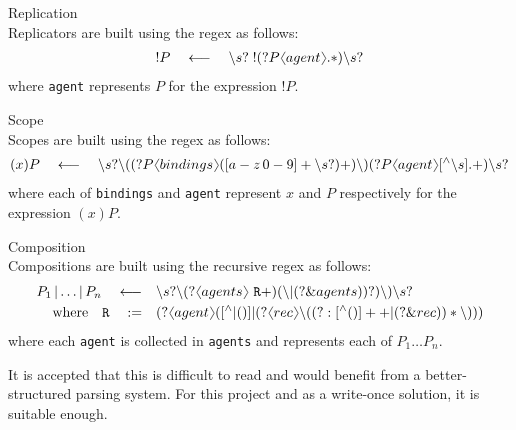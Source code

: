         \begin{definition}{Replication\\}
            Replicators are built using the regex as follows:
            \begin{align*}
                ! P \quad \longleftarrow \quad \backslash s? \; !(?P \langl agent \rangl.*)\backslash s?
            \end{align*}
            where \texttt{agent} represents $P$ for the expression $!P$.
        \end{definition}

        \begin{definition}{Scope\\}
            Scopes are built using the regex as follows:
            \begin{align*}
                (x)P \quad \longleftarrow \quad \backslash s? \backslash ((?P \langl bindings \rangl([a-z \, 0-9]+ \backslash s?)+)\backslash )(?P\langl agent \rangl[^{\wedge}\backslash s].+)\backslash s?
            \end{align*}
            where each of \texttt{bindings} and \texttt{agent} represent $x$ and $P$ respectively for the expression $(x) P$.
        \end{definition}

        \begin{definition}{Composition\\}
            Compositions are built using the recursive regex as follows:
            \begin{align*}
                P_1 \, | \ldots | \, P_n \quad \longleftarrow \quad & \backslash s? \backslash (?\langl agents\rangl~\texttt{R}+) (\backslash | (?\&agents))?)\backslash )\backslash s? \\
                \text{where} \quad \texttt{R} \quad \defeq \quad & (?\langl agent\rangl([^{\wedge}|()] | (?\langl rec\rangl\backslash ((?:[^{\wedge}()]++|(?\&rec))*\backslash )))
            \end{align*}
            where each \texttt{agent} is collected in \texttt{agents} and represents each of $P_1 \ldots P_n$.
        \end{definition}
        It is accepted that this is difficult to read and would benefit from a better-structured parsing system.
        For this project and as a write-once solution, it is suitable enough.


